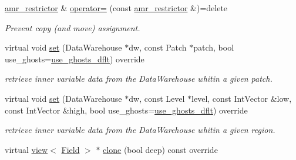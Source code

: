 \begin{DoxyCompactItemize}
\hyperlink{classUintah_1_1PhaseField_1_1detail_1_1amr__restrictor}{amr\+\_\+restrictor} \& \hyperlink{classUintah_1_1PhaseField_1_1detail_1_1amr__restrictor_3_01ScalarField_3_01T_01_4_00_01Problem_0778720acc9a55f696b8537356a4dbcae_a90a87c8184a3e38dca6057f1f5950659}{operator=} (const \hyperlink{classUintah_1_1PhaseField_1_1detail_1_1amr__restrictor}{amr\+\_\+restrictor} \&)=delete
\begin{DoxyCompactList}\small\item\em Prevent copy (and move) assignment. \end{DoxyCompactList}\item 
virtual void \hyperlink{classUintah_1_1PhaseField_1_1detail_1_1amr__restrictor_3_01ScalarField_3_01T_01_4_00_01Problem_0778720acc9a55f696b8537356a4dbcae_a9b2995c37fd05414ef795bab71d89693}{set} (Data\+Warehouse $\ast$dw, const Patch $\ast$patch, bool use\+\_\+ghosts=\hyperlink{classUintah_1_1PhaseField_1_1detail_1_1amr__restrictor_3_01ScalarField_3_01T_01_4_00_01Problem_0778720acc9a55f696b8537356a4dbcae_a4cae73002d40229c69caae07718b94d4}{use\+\_\+ghosts\+\_\+dflt}) override
\begin{DoxyCompactList}\small\item\em retrieve inner variable data from the Data\+Warehouse whitin a given patch. \end{DoxyCompactList}\item 
virtual void \hyperlink{classUintah_1_1PhaseField_1_1detail_1_1amr__restrictor_3_01ScalarField_3_01T_01_4_00_01Problem_0778720acc9a55f696b8537356a4dbcae_ace64828bcebd35f8bbb6bfc203a08c86}{set} (Data\+Warehouse $\ast$dw, const Level $\ast$level, const Int\+Vector \&low, const Int\+Vector \&high, bool use\+\_\+ghosts=\hyperlink{classUintah_1_1PhaseField_1_1detail_1_1amr__restrictor_3_01ScalarField_3_01T_01_4_00_01Problem_0778720acc9a55f696b8537356a4dbcae_a4cae73002d40229c69caae07718b94d4}{use\+\_\+ghosts\+\_\+dflt}) override
\begin{DoxyCompactList}\small\item\em retrieve inner variable data from the Data\+Warehouse whitin a given region. \end{DoxyCompactList}\item 
virtual \hyperlink{classUintah_1_1PhaseField_1_1detail_1_1view}{view}$<$ \hyperlink{structUintah_1_1PhaseField_1_1ScalarField}{Field} $>$ $\ast$ \hyperlink{classUintah_1_1PhaseField_1_1detail_1_1amr__restrictor_3_01ScalarField_3_01T_01_4_00_01Problem_0778720acc9a55f696b8537356a4dbcae_ac7b27aad09d6d193f1cfe96ce2f69f8f}{clone} (bool deep) const override

\end{DoxyCompactItemize}
